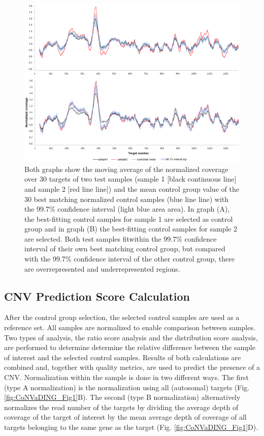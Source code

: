\begin{figure}[!ht]
	\includegraphics[width=1.0\linewidth]{img/CoNVaDING_Fig2}
	\caption[CoNVaDING match control group]{Both graphs show the moving average of the normalized coverage over 30 targets of two test samples (sample 1 [black continuous line] and sample 2 [red line line]) and the mean control group value of the 30 best matching normalized control samples (blue line line) with the 99.7\% confidence interval (light blue area area). In graph (A), the best-fitting control samples for sample 1 are selected as control group and in graph (B) the best-fitting control samples for sample 2 are selected. Both test samples fitwithin the 99.7\% confidence interval of their own best matching control group, but compared with the 99.7\% confidence interval of the other control group, there are overrepresented and underrepresented regions.}
	\label{fig:CoNVaDING_Fig2}
\end{figure}

\subsection{CNV Prediction Score Calculation}
After the control group selection, the selected control samples are used as a reference set. 
All samples are normalized to enable comparison between samples. Two types of analysis, the ratio score analysis and the distribution score analysis, are performed to determine determine the relative difference between the sample of interest and the selected control samples. 
Results of both calculations are combined and, together with quality metrics, are used to predict the presence of a CNV. 
Normalization within the sample is done in two different ways.
The first (type A normalization) is the normalization using all (autosomal) targets (Fig. \ref{fig:CoNVaDING_Fig1}B). 
The second (type B normalization) alternatively normalizes the read number of the targets by dividing the average depth of coverage of the target of interest by the mean average depth of coverage of all targets belonging to the same gene as the target (Fig. \ref{fig:CoNVaDING_Fig1}D).

